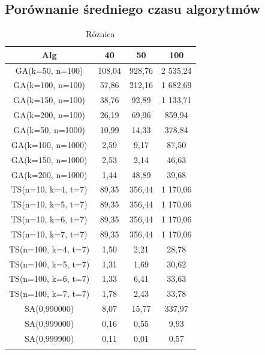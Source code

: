 \documentclass[wide,a4paper,titlepage,12pt] {article}
\begin{document}
\subsection{Porównanie średniego czasu algorytmów}
\begin{center}
    \begin{longtable}{|c|c|c|c|}
        \hline
         Alg  & 40&  50 & 100 \\ \hline
        GA(k=50, n=100)& 108,04&  928,76 & 2 535,24\\ \hline
        GA(k=100, n=100)  &  57,86 &  212,16 & 1 682,69\\ \hline
        GA(k=150, n=100)  &  38,76  & 92,89&   1 133,71\\ \hline
        GA(k=200, n=100)   & 26,19  & 69,96 &  859,94\\ \hline
        GA(k=50, n=1000)   & 10,99 &  14,33 &  378,84\\ \hline
        GA(k=100, n=1000) & 2,59  &  9,17  &  87,50\\ \hline
        GA(k=150, n=1000) &  2,53  &  2,14 &   46,63\\ \hline
        GA(k=200, n=1000)  & 1,44   & 48,89&   39,68\\ \hline
        TS(n=10, k=4, t=7) & 89,35  & 356,44 & 1 170,06\\ \hline
        TS(n=10, k=5, t=7) & 89,35  & 356,44&  1 170,06\\ \hline
        TS(n=10, k=6, t=7) & 89,35 &  356,44&  1 170,06\\ \hline
        TS(n=10, k=7, t=7) & 89,35 &  356,44 & 1 170,06\\ \hline
        TS(n=100, k=4, t=7) &1,50 &   2,21 &   28,78\\ \hline
        TS(n=100, k=5, t=7) &1,31  &  1,69 &   30,62\\ \hline
        TS(n=100, k=6, t=7)& 1,33 &  6,41  &  33,63\\ \hline
        TS(n=100, k=7, t=7) &1,78  & 2,43  &  33,78\\ \hline
        SA(0,990000)  &  8,07   & 15,77 &  337,97\\ \hline
        SA(0,999000)  &  0,16  &  0,55  &  9,93\\ \hline
        SA(0,999900)  &  0,11  &  0,01 &   0,57\\ \hline
                \caption{Różnica}
    \end{longtable}
    
\end{center}
\end{document}
